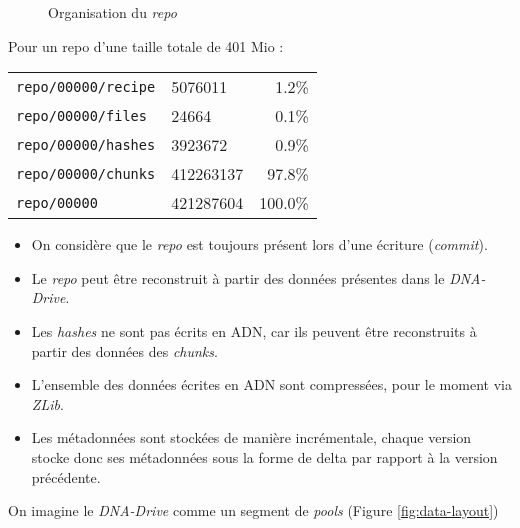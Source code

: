 \documentclass[a4paper,twocolumn]{article}
\begin{document}
\begin{figure}[ht]
\caption{Organisation du \emph{repo}}
\label{fig:repo-organisation}
\end{figure}

Pour un repo d'une taille totale de 401 Mio :
\smallskip

\begin{tabular}{l l r}
\verb|repo/00000/recipe| &   5076011 &   1.2\% \\
\verb|repo/00000/files| &      24664 &   0.1\% \\
\verb|repo/00000/hashes| &   3923672 &   0.9\% \\
\verb|repo/00000/chunks| & 412263137 &  97.8\% \\
\verb|repo/00000| &        421287604 & 100.0\% \\
\end{tabular}
\bigskip

\begin{itemize}
\item
  On considère que le \emph{repo} est toujours présent lors d'une
  écriture (\emph{commit}).
\item
  Le \emph{repo} peut être reconstruit à partir des données présentes
  dans le \emph{DNA-Drive}.
\item
  Les \emph{hashes} ne sont pas écrits en ADN, car ils peuvent être
  reconstruits à partir des données des \emph{chunks}.
\item
  L'ensemble des données écrites en ADN sont compressées, pour le moment
  via \emph{ZLib}.
\item
  Les métadonnées sont stockées de manière incrémentale, chaque version
  stocke donc ses métadonnées sous la forme de delta par rapport à la
  version précédente.
\end{itemize}

On imagine le \emph{DNA-Drive} comme un segment de \emph{pools} (Figure \ref{fig:data-layout})
\end{document}
